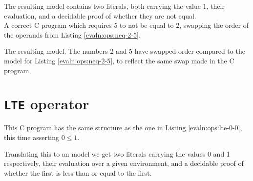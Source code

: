     The resulting model contains two literals, both carrying the value 1, their evaluation, and a decidable proof of whether they are not equal.
    \\
    
    
    A correct C program which requires 5 to not be equal to 2, swapping the order of the operands from Listing \ref{evaln:ops:neq-2-5}.
    
    The resulting \Idris model. The numbers 2 and 5 have swapped order compared to the model for Listing \ref{evaln:ops:neq-2-5}, to reflect the same swap made in the C program.


\section{\texttt{LTE} operator}\label{app:evaln:ops:lte}
    
    
    This C program has the same structure as the one in Listing \ref{evaln:ops:lte-0-0}, this time asserting $0 \leq 1$.
    
    
    Translating this to an \Idris model we get two literals carrying the values 0 and 1 respectively, their evaluation over a given environment, and a decidable proof of whether the first is less than or equal to the first.
